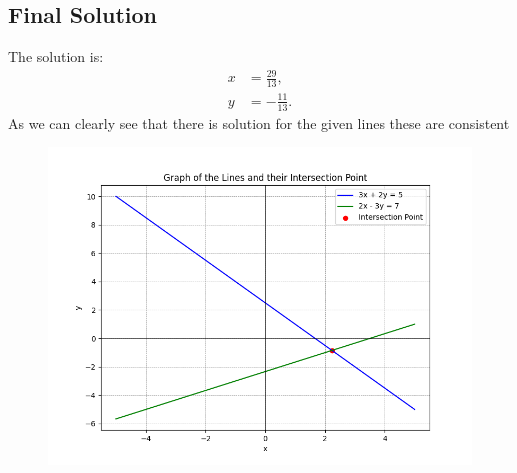 \documentclass[journal]{IEEEtran}
\begin{document}
	\subsection*{Final Solution}
	The solution is:
	\begin{align}
		x &= \frac{29}{13}, \\
		y &= -\frac{11}{13}.
	\end{align}
	As we can clearly see that there is solution for the given lines these are consistent 
	\begin{figure}[h!]
		\centering
		\includegraphics[width=\columnwidth]{figs/Fig.png}
	\end{figure}
\end{document}
